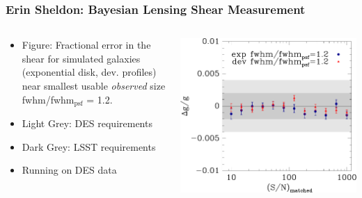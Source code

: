 \documentclass{beamer}
\begin{document}
\frame
{
    \frametitle{Erin Sheldon: Bayesian Lensing Shear Measurement}

    \fontsize{9}{0.8\baselineskip}
    \begin{columns}
        \begin{column}{0.4\textwidth}
            \begin{itemize}

                \item Figure: Fractional error in the shear for simulated
                    galaxies (exponential disk, dev. profiles) near
                    smallest usable {\it observed} size
                    fwhm/fwhm$_{\textrm{psf}}$ = 1.2.

                \item Light Grey: DES requirements
                \item Dark Grey: LSST requirements
                \item Running on DES data
            \end{itemize}
        \end{column}
        \begin{column}{0.6\textwidth}
            \includegraphics[width=\textwidth]{ngmix-fwhm12.pdf}
            \newline

        \end{column}
    \end{columns}

}
\end{document}
